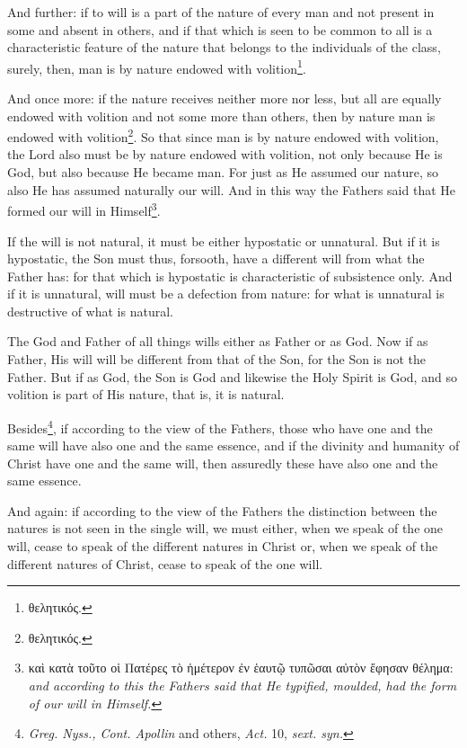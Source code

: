 And further: if to will is a part of the nature of every man and not present in some and absent in others, and if that which is seen to be common to all is a characteristic feature of the nature that belongs to the individuals of the class, surely, then, man is by nature endowed with volition\footnote{\textgreek{θελητικός}.}.

And once more: if the nature receives neither more nor less, but all are equally endowed with volition and not some more than others, then by nature man is endowed with volition\footnote{\textgreek{θελητικός}.}. So that since man is by nature endowed with volition, the Lord also must be by nature endowed with volition, not only because He is God, but also because He became man. For just as He assumed our nature, so also He has assumed naturally our will. And in this way the Fathers said that He formed our will in Himself\footnote{\textgreek{καὶ κατὰ τοῦτο οἱ Πατέρες τὸ ἡμέτερον ἐν ἑαυτῷ τυπῶσαι αὐτὸν ἔφησαν θέλημα}: \emph{and according to this the Fathers said that He typified, moulded, had the form of our will in Himself.}}.

If the will is not natural, it must be either hypostatic or unnatural. But if it is hypostatic, the Son must thus, forsooth, have a different will from what the Father has: for that which is hypostatic is characteristic of subsistence only. And if it is unnatural, will must be a defection from nature: for what is unnatural is destructive of what is natural.

The God and Father of all things wills either as Father or as God. Now if as Father, His will will be different from that of the Son, for the Son is not the Father. But if as God, the Son is God and likewise the Holy Spirit is God, and so volition is part of His nature, that is, it is natural.

Besides\footnote{\emph{Greg. Nyss., Cont. Apollin }and others, \emph{Act. }10, \emph{sext. syn.}}, if according to the view of the Fathers, those who have one and the same will have also one and the same essence, and if the divinity and humanity of Christ have one and the same will, then assuredly these have also one and the same essence.

And again: if according to the view of the Fathers the distinction between the natures is not seen in the single will, we must either, when we speak of the one will, cease to speak of the different natures in Christ or, when we speak of the different natures of Christ, cease to speak of the one will.

